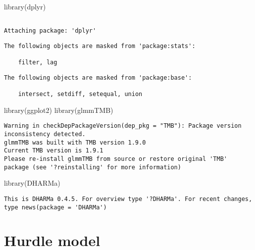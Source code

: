 \documentclass[
  letterpaper,
  DIV=11,
  numbers=noendperiod]{scrreprt}
\newenvironment{Shaded}{\begin{snugshade}}{\end{snugshade}}
\newcommand{\FunctionTok}[1]{\textcolor[rgb]{0.28,0.35,0.67}{#1}}
\newcommand{\NormalTok}[1]{\textcolor[rgb]{0.00,0.23,0.31}{#1}}
\begin{document}
\begin{Shaded}
\begin{Highlighting}[]
\FunctionTok{library}\NormalTok{(dplyr)}
\end{Highlighting}
\end{Shaded}

\begin{verbatim}

Attaching package: 'dplyr'
\end{verbatim}

\begin{verbatim}
The following objects are masked from 'package:stats':

    filter, lag
\end{verbatim}

\begin{verbatim}
The following objects are masked from 'package:base':

    intersect, setdiff, setequal, union
\end{verbatim}

\begin{Shaded}
\begin{Highlighting}[]
\FunctionTok{library}\NormalTok{(ggplot2)}
\FunctionTok{library}\NormalTok{(glmmTMB)}
\end{Highlighting}
\end{Shaded}

\begin{verbatim}
Warning in checkDepPackageVersion(dep_pkg = "TMB"): Package version inconsistency detected.
glmmTMB was built with TMB version 1.9.0
Current TMB version is 1.9.1
Please re-install glmmTMB from source or restore original 'TMB' package (see '?reinstalling' for more information)
\end{verbatim}

\begin{Shaded}
\begin{Highlighting}[]
\FunctionTok{library}\NormalTok{(DHARMa)}
\end{Highlighting}
\end{Shaded}

\begin{verbatim}
This is DHARMa 0.4.5. For overview type '?DHARMa'. For recent changes, type news(package = 'DHARMa')
\end{verbatim}

\hypertarget{hurdle-model}{%
\section{Hurdle model}\label{hurdle-model}}
\end{document}
